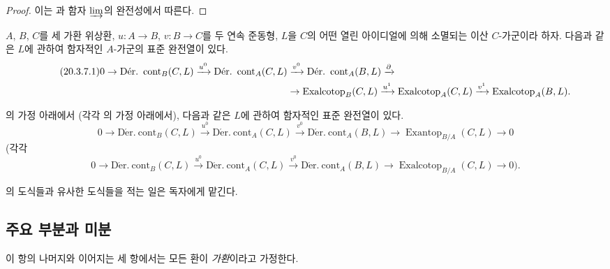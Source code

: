 \begin{proof}
이는 과 함자 $\varinjlim$의 완전성에서 따른다.
\end{proof}

\begin{corollary}[20.3.7]
\label{0.20.3.7-ko}
$A$, $B$, $C$를 세 가환 위상환, $u:A\to B$, $v:B\to C$를 두
연속 준동형, $L$을 $C$의 어떤 열린 아이디얼에 의해 소멸되는 이산
$C$-가군이라 하자. 다음과 같은 $L$에 관하여 함자적인 $A$-가군의
표준 완전열이 있다.
\begin{align}
\tag{20.3.7.1}
\label{0.20.3.7.1-ko}
  0\to\operatorname{D\acute{e}r.\ cont}_B(C,L)\xrightarrow{u^0}
  \operatorname{D\acute{e}r.\ cont}_A(C,L)&\xrightarrow{v^0}
  \operatorname{D\acute{e}r.\ cont}_A(B,L)\xrightarrow{\partial} \\
  &\to\operatorname{Exalcotop}_B(C,L)\xrightarrow{u^1}
  \operatorname{Exalcotop}_A(C,L)\xrightarrow{v^1}
  \operatorname{Exalcotop}_A(B,L). \notag
\end{align}
\end{corollary}

\begin{corollary}[20.3.8]
\label{0.20.3.8-ko}
의 가정 아래에서 (각각
의 가정 아래에서), 다음과 같은 $L$에 관하여
함자적인 표준 완전열이 있다.
\begin{equation}
\tag{20.3.8.1}
\label{0.20.3.8.1-ko}
  0\to\operatorname{D\acute{e}r.\ cont}_B(C,L)\xrightarrow{u^0}
  \operatorname{D\acute{e}r.\ cont}_A(C,L)\xrightarrow{v^0}
  \operatorname{D\acute{e}r.\ cont}_A(B,L)\to
  \operatorname{Exantop}_{B/A}(C,L)\to0
\end{equation}
(각각
\begin{equation}
\tag{20.3.8.2}
\label{0.20.3.8.2-ko}
  0\to\operatorname{D\acute{e}r.\ cont}_B(C,L)\xrightarrow{u^0}
  \operatorname{D\acute{e}r.\ cont}_A(C,L)\xrightarrow{v^0}
  \operatorname{D\acute{e}r.\ cont}_A(B,L)\to
  \operatorname{Exalcotop}_{B/A}(C,L)\to0\text{).}
\end{equation}
\end{corollary}

의 도식들과 유사한 도식들을 적는 일은 독자에게
맡긴다.

\subsection{주요 부분과 미분}
\label{subsection:0.20.4-ko}

이 항의 나머지와 이어지는 세 항에서는 모든 환이 \emph{가환}이라고
가정한다.

